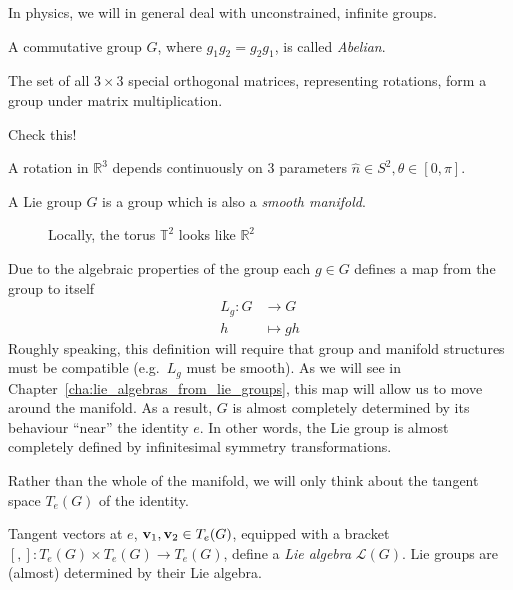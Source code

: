 In physics, we will in general deal with unconstrained, infinite groups.

\begin{definition}
A commutative group $G$, where $g_1 g_2 = g_2 g_1$, is called \emph{Abelian}.
\end{definition}

The set of all $3\times 3$ special orthogonal matrices, representing rotations, form a group under matrix multiplication.

\begin{exercise}
Check this!
\end{exercise}

A rotation in $\mathbb{R}^3$ depends continuously on 3 parameters $\hat n \in S^2, \theta \in [0, \pi]$.

\begin{definition}
A Lie group $G$ is a group which is also a \emph{smooth manifold}.
\end{definition}

\begin{figure}[htpb]
  \centering
  \def\svgwidth{0.6\columnwidth}
  
  \caption{Locally, the torus $\mathbb{T}^2$ looks like $\mathbb{R}^{2}$}
  \label{fig:l1f1}
\end{figure}

Due to the algebraic properties of the group each $g \in G$ defines a map from the group to itself
\begin{equation}
  \begin{split}
    L_g \colon G &\to G \\
    h &\mapsto gh
  \end{split}
\end{equation}
Roughly speaking, this definition will require that group and manifold structures must be compatible (e.g.~$L_{g}$ must be smooth).
As we will see in Chapter~\ref{cha:lie_algebras_from_lie_groups}, this map will allow us to move around the manifold. As a result, $G$ is almost completely determined by its behaviour ``near'' the identity $e$.
In other words, the Lie group is almost completely defined by infinitesimal symmetry transformations.

Rather than the whole of the manifold, we will only think about the tangent space $T_e (G)$ of the identity.

Tangent vectors at $e$, $\vb v_1, \vb v_2 \in T_e (G)$, equipped with a bracket $[, ]: T_e(G) \times T_e(G) \rightarrow T_e(G)$, define a \emph{Lie algebra} $\mathscr{L}(G)$.
Lie groups are (almost) determined by their Lie algebra.

